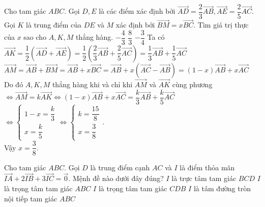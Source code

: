 \begin{ex}%
	Cho tam giác $ABC$. Gọi $D, E$ là các điểm xác định bởi $\overrightarrow{AD} = \dfrac{2}{3}\overrightarrow{AB},\overrightarrow{AE} = \dfrac{2}{5}\overrightarrow{AC}$. Gọi $K$ là trung điểm của $DE$ và $M$ xác định bởi $\overrightarrow{BM} = x\overrightarrow{BC}$. Tìm giá trị thực của $x$ sao cho $A,K,M$ thẳng hàng.
	{$-\dfrac{4}{3}$}
	{$\dfrac{8}{3}$}
	{$-\dfrac{3}{4}$}
	\loigiai
	{Ta có $\overrightarrow {AK}  = \dfrac{1}{2}\left( {\overrightarrow {AD}  + \overrightarrow {AE} } \right) = \dfrac{1}{2}\left( {\dfrac{2}{3}\overrightarrow {AB}  + \dfrac{2}{5}\overrightarrow {AC} } \right) = \dfrac{1}{3}\overrightarrow {AB}  + \dfrac{1}{5}\overrightarrow {AC} $\\
		$\overrightarrow {AM}  = \overrightarrow {AB}  + \overrightarrow {BM}  = \overrightarrow {AB}  + x\overrightarrow {BC}  = \overrightarrow {AB}  + x\left( {\overrightarrow {AC}  - \overrightarrow {AB} } \right) = \left( {1 - x} \right)\overrightarrow {AB}  + x\overrightarrow {AC} $\\
		Do đó $A,K,M$  thẳng hàng khi và chỉ khi $\overrightarrow{AM}$ và $\overrightarrow{AK}$ cùng phương\\
		$ \Leftrightarrow \overrightarrow {AM}  = k\overrightarrow {AK}  \Leftrightarrow \left( {1 - x} \right)\overrightarrow {AB}  + x\overrightarrow {AC}  = \dfrac{k}{3}\overrightarrow {AB}  + \dfrac{k}{5}\overrightarrow {AC} $\\
		$ \Leftrightarrow \left\{ \begin{array}{l}
				1 - x = \dfrac{k}{3} \\
				x = \dfrac{k}{5}
			\end{array} \right. \Leftrightarrow \left\{ \begin{array}{l}
				k = \dfrac{{15}}{8} \\
				x = \dfrac{3}{8}
			\end{array} \right.$.\\
		Vậy $x=\dfrac{3}{8}$.}
\end{ex}
\begin{ex}%
	Cho tam giác $ABC$. Gọi $D$ là trung điểm cạnh $AC$ và $I$ là điểm thỏa mãn  $\overrightarrow{IA} +2\overrightarrow{IB} +3\overrightarrow{IC}=\overrightarrow{0}$. Mệnh đề nào dưới đây đúng?
	\choice
	{$I$ là trực tâm tam giác $BCD$}
	{$I$ là trọng tâm tam giác $ABC$}
	{\True $I$ là trọng tâm tam giác $CDB$}
	{$I$ là tâm đường tròn nội tiếp tam giác $ABC$}
\end{ex}

